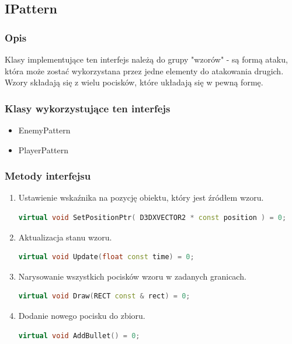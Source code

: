 \documentclass[a4paper,twoside]{article}
\begin{document}
				\subsection{IPattern}
					\subsubsection{Opis}
					Klasy implementujące ten interfejs należą do grupy "wzorów" - są formą ataku, która może zostać wykorzystana przez jedne elementy do atakowania drugich. Wzory składają się z wielu pocisków, które układają się w pewną formę.
					\subsubsection{Klasy wykorzystujące ten interfejs}
					\begin{itemize}
						\item EnemyPattern
						\item PlayerPattern
					\end{itemize}
					\newpage
					\subsubsection{Metody interfejsu}
					\begin{enumerate}
						\item Ustawienie wskaźnika na pozycję obiektu, który jest źródłem wzoru.
						\begin{lstlisting}[language=C++]
							virtual void SetPositionPtr( D3DXVECTOR2 * const position ) = 0;
						\end{lstlisting}
						\item Aktualizacja stanu wzoru.
						\begin{lstlisting}[language=C++]
							virtual void Update(float const time) = 0;
						\end{lstlisting}
						\item Narysowanie wszystkich pocisków wzoru w zadanych granicach.
						\begin{lstlisting}[language=C++]
							virtual void Draw(RECT const & rect) = 0;
						\end{lstlisting}
						\item Dodanie nowego pocisku do zbioru.
						\begin{lstlisting}[language=C++]
							virtual void AddBullet() = 0;
						\end{lstlisting}
					\end{enumerate}
\end{document}
